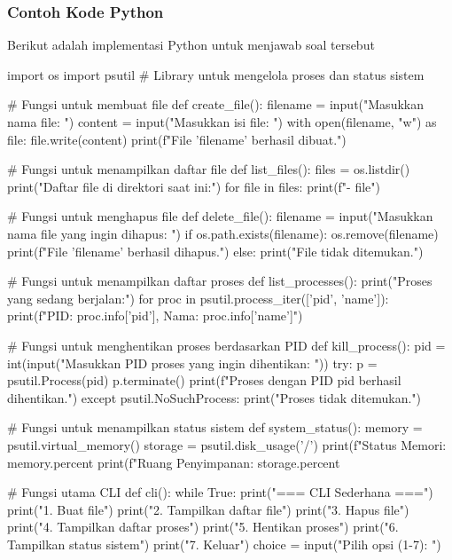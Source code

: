 \documentclass[12pt]{article}
\begin{document}
 
\subsubsection{\textbf{Contoh Kode Python}}

Berikut adalah implementasi Python untuk menjawab soal tersebut

\begin{python}
    
    import os
    import psutil  # Library untuk mengelola proses dan status sistem
    
    # Fungsi untuk membuat file
    def create_file():
        filename = input("Masukkan nama file: ")
        content = input("Masukkan isi file: ")
        with open(filename, "w") as file:
            file.write(content)
        print(f"File '{filename}' berhasil dibuat.")
    
    # Fungsi untuk menampilkan daftar file
    def list_files():
        files = os.listdir()
        print("Daftar file di direktori saat ini:")
        for file in files:
            print(f"- {file}")
    
    # Fungsi untuk menghapus file
    def delete_file():
        filename = input("Masukkan nama file yang ingin dihapus: ")
        if os.path.exists(filename):
            os.remove(filename)
            print(f"File '{filename}' berhasil dihapus.")
        else:
            print("File tidak ditemukan.")
    
    # Fungsi untuk menampilkan daftar proses
    def list_processes():
        print("Proses yang sedang berjalan:")
        for proc in psutil.process_iter(['pid', 'name']):
            print(f"PID: {proc.info['pid']}, Nama: {proc.info['name']}")
    
    # Fungsi untuk menghentikan proses berdasarkan PID
    def kill_process():
        pid = int(input("Masukkan PID proses yang ingin dihentikan: "))
        try:
            p = psutil.Process(pid)
            p.terminate()
            print(f"Proses dengan PID {pid} berhasil dihentikan.")
        except psutil.NoSuchProcess:
            print("Proses tidak ditemukan.")
    
    # Fungsi untuk menampilkan status sistem
    def system_status():
        memory = psutil.virtual_memory()
        storage = psutil.disk_usage('/')
        print(f"Status Memori: {memory.percent}%
        print(f"Ruang Penyimpanan: {storage.percent}%
    
    # Fungsi utama CLI
    def cli():
        while True:
            print("\n=== CLI Sederhana ===")
            print("1. Buat file")
            print("2. Tampilkan daftar file")
            print("3. Hapus file")
            print("4. Tampilkan daftar proses")
            print("5. Hentikan proses")
            print("6. Tampilkan status sistem")
            print("7. Keluar")
            choice = input("Pilih opsi (1-7): ")
    

\end{python}
\end{document}
